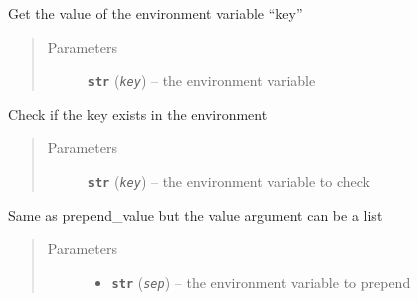 \documentclass[a4paper,10pt,english]{sphinxmanual}
\begin{document}
\begin{fulllineitems}

\begin{fulllineitems}
\label{commands/apidoc/src:src.fileEnviron.LauncherFileEnviron.get}
Get the value of the environment variable ``key''
\begin{quote}\begin{description}
\item[{Parameters}] \leavevmode
\textbf{\texttt{str}} (\emph{\texttt{key}}) -- the environment variable

\end{description}\end{quote}

\end{fulllineitems}


\begin{fulllineitems}
\label{commands/apidoc/src:src.fileEnviron.LauncherFileEnviron.is_defined}
Check if the key exists in the environment
\begin{quote}\begin{description}
\item[{Parameters}] \leavevmode
\textbf{\texttt{str}} (\emph{\texttt{key}}) -- the environment variable to check

\end{description}\end{quote}

\end{fulllineitems}


\begin{fulllineitems}
\label{commands/apidoc/src:src.fileEnviron.LauncherFileEnviron.prepend}
Same as prepend\_value but the value argument can be a list
\begin{quote}\begin{description}
\item[{Parameters}] \leavevmode\begin{itemize}
\item {} 
\textbf{\texttt{str}} (\emph{\texttt{sep}}) -- the environment variable to prepend


\end{itemize}
\end{description}
\end{quote}
\end{fulllineitems}
\end{fulllineitems}
\end{document}
